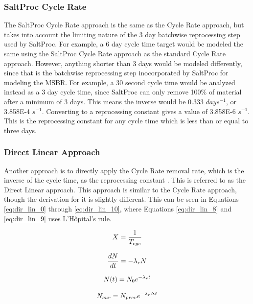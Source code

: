 \subsubsection{SaltProc Cycle Rate}

The SaltProc Cycle Rate approach is the same as the Cycle Rate approach, but takes into account the limiting nature of the 3 day batchwise reprocessing step used by SaltProc. For example, a 6 day cycle time target would be modeled the same using the SaltProc Cycle Rate approach as the standard Cycle Rate approach. However, anything shorter than 3 days would be modeled differently, since that is the batchwise reprocessing step inocorporated by SaltProc for modeling the MSBR. For example, a 30 second cycle time would be analyzed instead as a 3 day cycle time, since SaltProc can only remove 100\% of material after a minimum of 3 days. This means the inverse would be 0.333 $days^{-1}$, or 3.858E-4 $s^{-1}$. Converting to a reprocessing constant gives a value of 3.858E-6 $s^{-1}$. This is the reprocessing constant for any cycle time which is less than or equal to three days.

\subsubsection{Direct Linear Approach}

Another approach is to directly apply the Cycle Rate removal rate, which is the inverse of the cycle time, as the reprocessing constant \cite{hombourger_eql0d_2020}. This is referred to as the Direct Linear approach. This approach is similar to the Cycle Rate approach, though the derivation for it is slightly different. This can be seen in Equations \eqref{eq:dir_lin_0} through \eqref{eq:dir_lin_10}, where Equations \eqref{eq:dir_lin_8} and \eqref{eq:dir_lin_9} uses L'Hôpital's rule.

\begin{equation} \hfill
X = \frac{1}{T_{cyc}}
\hfill\label{eq:dir_lin_0} \end{equation}

\begin{equation} \hfill
\frac{dN}{dt} = -\lambda_r N
\hfill\label{eq:dir_lin_1} \end{equation}

\begin{equation} \hfill
N(t) = N_0 e^{-\lambda_r t}
\hfill\label{eq:dir_lin_1_2} \end{equation}

\begin{equation} \hfill
N_{cur} = N_{prev} e^{-\lambda_r \Delta t}
\hfill\label{eq:dir_lin_2} \end{equation}

